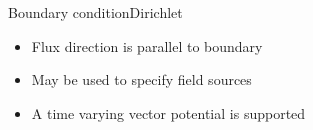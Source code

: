 %
%
%
%
%

\begin{frame}{Boundary condition}{Dirichlet}
  \begin{itemize}
  \item Flux direction is parallel to boundary
  \item May be used to specify field sources
  \item A time varying vector potential is supported
  \end{itemize}
  \vfill
  \centering
\end{frame}

